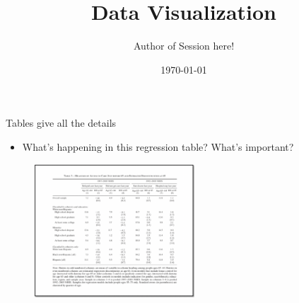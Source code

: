 \documentclass[aspectratio=169]{beamer}
\title{Data Visualization}
\date{\today}
\author{Author of Session here!} %
\institute{Development Impact Evaluation (DIME) \newline The World Bank }
\begin{document}
	
{
	\maketitle
}


\begin{frame}{Tables give all the details}
	\begin{multicols}{2}	
	
	\begin{itemize}[<default overlay specification>]
		\item<1> What’s happening in this regression table? What’s important?
	\end{itemize}
	
	\begin{figure}
		\centering
		\includegraphics[width=60mm]{img/Table}
	\end{figure}
	
\end{multicols}
\end{frame}
\end{document}
